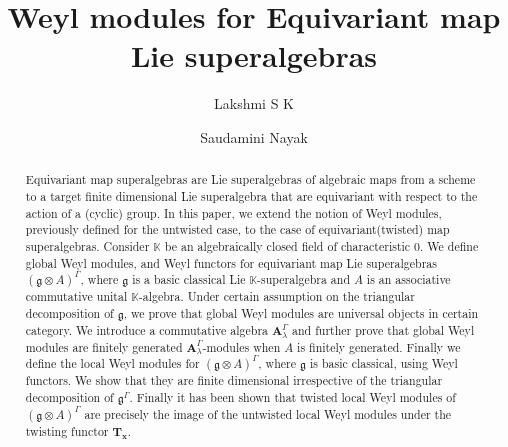 \documentclass[11pt]{amsart}
\theoremstyle{plain}
\theoremstyle{definition}
\newcommand{\g}{\mathfrak{g}}
\begin{document}
\title{Weyl modules for Equivariant map Lie superalgebras}

\author[Lakshmi S K]{Lakshmi S K}
\address{Lakshmi S K, Department of Mathematics, National Institute of Technology Calicut, NIT Campus P.O., Kozhikode-673 601, India}

\author[Nayak]{Saudamini Nayak}
\address{Saudamini Nayak, Department of Mathematics, National Institute of Technology Calicut, NIT Campus P.O., Kozhikode-673 601, India}


\begin{abstract}
 Equivariant map superalgebras are Lie superalgebras of algebraic maps from a scheme to a target finite dimensional Lie superalgebra that are equivariant with respect to the action of a (cyclic) group. In this paper, we extend the notion of Weyl modules, previously defined for the untwisted case, to the case of equivariant(twisted) map superalgebras. Consider $\mathbb{K}$ be an algebraically closed field of characteristic $0$. We define global Weyl modules, and Weyl functors for equivariant map Lie superalgebras $(\g\otimes A)^{\Gamma}$, where $\g$ is a basic classical Lie $\mathbb{K}$-superalgebra and $A$ is an associative commutative unital $\mathbb{K}$-algebra. Under certain assumption on the triangular decomposition of $\g$, we prove that global Weyl modules are universal objects in certain category. We introduce a commutative algebra $\mathbf{A}_{\lambda}^{\Gamma}$ and further prove that global Weyl modules are finitely generated $\mathbf{A}_{\lambda}^{\Gamma}$-modules when $A$ is finitely generated. Finally we define the local Weyl modules for $(\g\otimes A)^{\Gamma}$, where $\g$ is basic classical, using Weyl functors. We show that they are finite dimensional irrespective of the triangular decomposition of $\g^{\Gamma}$. Finally it has been shown that twisted local Weyl modules of $(\g\otimes A)^{\Gamma}$ are precisely the image of the untwisted local Weyl modules under the twisting functor $\textbf{T}_{\mathbf{x}}$.
\end{abstract}


\maketitle
\end{document}
